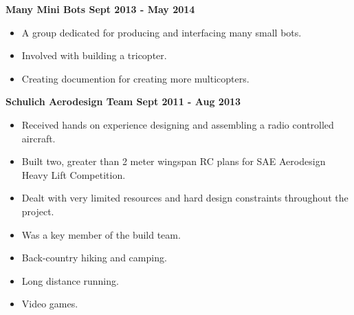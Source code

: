 \documentclass[12pt]{article}
\begin{document}
\noindent \centerline{\bf Many Mini Bots \hfill Sept 2013 - May 2014}
\begin{itemize}
  \item A group dedicated for producing and interfacing many small bots.
  \item Involved with building a tricopter.
  \item Creating documention for creating more multicopters.
\end{itemize}

\noindent \centerline{ \bf Schulich Aerodesign Team \hfill Sept 2011 - Aug 2013}
\begin{itemize}
  \item Received hands on experience  designing and assembling a radio controlled aircraft.
  \item Built two, greater than 2 meter wingspan RC plans for SAE Aerodesign Heavy Lift Competition.
  \item Dealt with very limited resources and hard design constraints throughout the project.
  \item Was a key member of the build team.
\end{itemize}

\bigskip
{}
\medskip
\begin{itemize}
\item Back-country hiking and camping.
\item Long distance running.
\item Video games.
\end{itemize}
\bigskip
\end{document}

